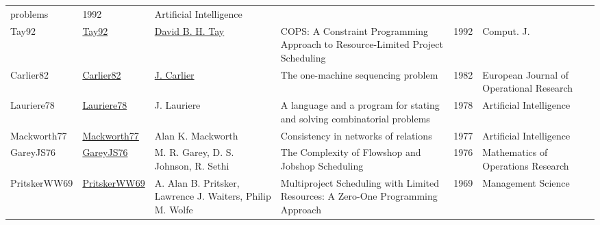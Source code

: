 {\begin{longtable}{p{2cm}p{2cm}p{5cm}p{10cm}rp{3cm}l}
problems & 1992 & Artificial Intelligence & \cite{MintonJPL92}\\Tay92 & \href{}{Tay92} & \hyperref[auth:a707]{David B. H. Tay} & {COPS:} {A} Constraint Programming Approach to Resource-Limited Project Scheduling & 1992 & Comput. J. & \cite{Tay92}\\Carlier82 & \href{http://dx.doi.org/10.1016/s0377-2217(82)80007-6}{Carlier82} & \hyperref[auth:a852]{J. Carlier} & The one-machine sequencing problem & 1982 & European Journal of Operational Research & \cite{Carlier82}\\Lauriere78 & \href{http://dx.doi.org/10.1016/0004-3702(78)90029-2}{Lauriere78} & J. Lauriere & A language and a program for stating and solving combinatorial problems & 1978 & Artificial Intelligence & \cite{Lauriere78}\\Mackworth77 & \href{http://dx.doi.org/10.1016/0004-3702(77)90007-8}{Mackworth77} & Alan K. Mackworth & Consistency in networks of relations & 1977 & Artificial Intelligence & \cite{Mackworth77}\\GareyJS76 & \href{http://dx.doi.org/10.1287/moor.1.2.117}{GareyJS76} & M. R. Garey, D. S. Johnson, R. Sethi & The Complexity of Flowshop and Jobshop Scheduling & 1976 & Mathematics of Operations Research & \cite{GareyJS76}\\PritskerWW69 & \href{http://dx.doi.org/10.1287/mnsc.16.1.93}{PritskerWW69} & A. Alan B. Pritsker, Lawrence J. Waiters, Philip M. Wolfe & Multiproject Scheduling with Limited Resources: A Zero-One Programming Approach & 1969 & Management Science & \cite{PritskerWW69}\\\end{longtable}
}

